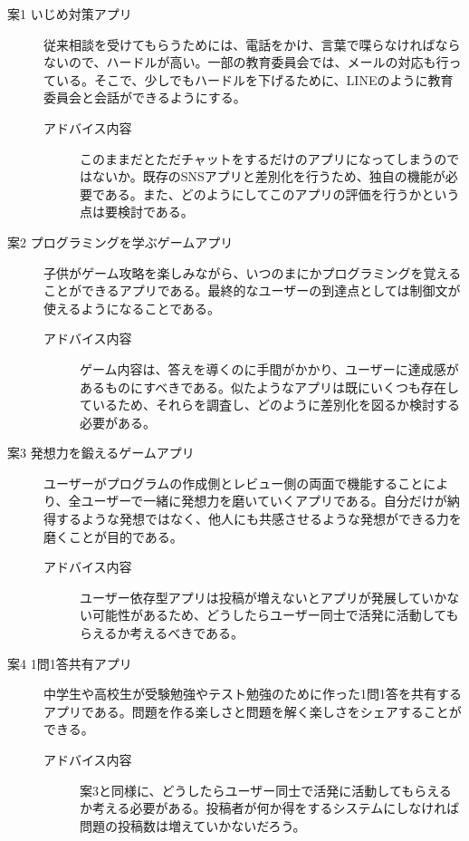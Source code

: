 \documentclass[openany,11pt,papersize]{jsbook}
\begin{document}
\begin{description}
 \item[案1 いじめ対策アプリ]
従来相談を受けてもらうためには、電話をかけ、言葉で喋らなければならないので、ハードルが高い。一部の教育委員会では、メールの対応も行っている。そこで、少しでもハードルを下げるために、LINEのように教育委員会と会話ができるようにする。
\begin{description}
 	\item[アドバイス内容]

	このままだとただチャットをするだけのアプリになってしまうのではないか。既存のSNSアプリと差別化を行うため、独自の機能が必要である。また、どのようにしてこのアプリの評価を行うかという点は要検討である。
	 \end{description}
 
  \item[案2 プログラミングを学ぶゲームアプリ]
子供がゲーム攻略を楽しみながら、いつのまにかプログラミングを覚えることができるアプリである。最終的なユーザーの到達点としては制御文が使えるようになることである。
	\begin{description}
 	\item[アドバイス内容]
	ゲーム内容は、答えを導くのに手間がかかり、ユーザーに達成感があるものにすべきである。似たようなアプリは既にいくつも存在しているため、それらを調査し、どのように差別化を図るか検討する必要がある。
	 \end{description}

  \item[案3 発想力を鍛えるゲームアプリ]
  ユーザーがプログラムの作成側とレビュー側の両面で機能することにより、全ユーザーで一緒に発想力を磨いていくアプリである。自分だけが納得するような発想ではなく、他人にも共感させるような発想ができる力を磨くことが目的である。
	\begin{description}
 	\item[アドバイス内容]
	ユーザー依存型アプリは投稿が増えないとアプリが発展していかない可能性があるため、どうしたらユーザー同士で活発に活動してもらえるか考えるべきである。
	 \end{description}
	 
 \item[案4 1問1答共有アプリ]
  中学生や高校生が受験勉強やテスト勉強のために作った1問1答を共有するアプリである。問題を作る楽しさと問題を解く楽しさをシェアすることができる。
	\begin{description}
 	\item[アドバイス内容]
	案3と同様に、どうしたらユーザー同士で活発に活動してもらえるか考える必要がある。投稿者が何か得をするシステムにしなければ問題の投稿数は増えていかないだろう。
	 \end{description}
	 

\end{description}
\end{document}
